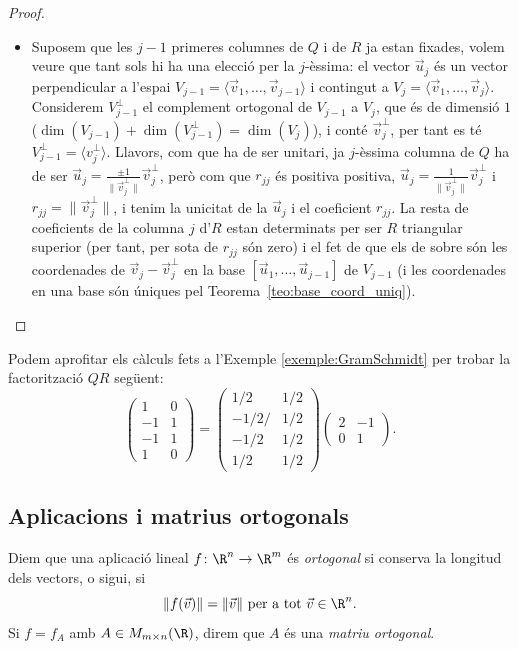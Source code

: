 \begin{proof}
\begin{itemize}
    \item Suposem que les $j-1$ primeres columnes de $Q$ i de $R$ ja estan fixades, volem veure que tant sols hi ha una elecció per la $j$-èssima: el vector $\vec u_j$ és un vector perpendicular a l'espai $V_{j-1}=\langle \vec v_1, \dots, \vec v_{j-1}\rangle$ i contingut a $V_j=\langle \vec v_1, \dots, \vec v_j\rangle$. Considerem $V_{j-1}^\perp$ el complement ortogonal de $V_{j-1}$ a $V_j$, que és de dimensió $1$ ($\dim(V_{j-1})+\dim(V_{j-1}^\perp)=\dim(V_j)$), i conté $\vec v_j^\perp$, per tant es té $V_{j-1}^\perp=\langle v_j^\perp \rangle$. Llavors, com que ha de ser unitari, ja $j$-èssima columna de $Q$ ha de ser $\vec u_j=\frac{\pm1}{\|\vec v_j^\perp\|}\vec v_j^\perp$, però com que $r_{jj}$ és positiva positiva, $\vec u_j=\frac{1}{\|\vec v_j^\perp\|}\vec v_j^\perp$ i $r_{jj}=\|\vec v_j^\perp\|$, i tenim la unicitat de la $\vec u_j$ i el coeficient $r_{jj}$. La resta de coeficients de la columna $j$ d'$R$ estan determinats per ser $R$ triangular superior (per tant, per sota de $r_{jj}$ són zero) i el fet de que els de sobre són les coordenades de $\vec v_j-\vec v_j^\perp$ en la base $[\vec u_1,\dots,\vec u_{j-1}]$ de $V_{j-1}$ (i les coordenades en una base són úniques pel Teorema~\ref{teo:base_coord_uniq}).
\end{itemize}
\end{proof}
\begin{exemple}
Podem aprofitar els càlculs fets a l'Exemple \ref{exemple:GramSchmidt} per trobar la factorització $QR$ següent:
\[
\begin{pmatrix}
1 & 0 \\ -1 & 1 \\ -1 & 1 \\ 1 & 0
\end{pmatrix}=
\begin{pmatrix}
1/2 & 1/2 \\ -1/2/ & 1/2 \\ -1/2 & 1/2 \\ 1/2 & 1/2
\end{pmatrix}
\begin{pmatrix}
2 & -1 \\ 0 & 1
\end{pmatrix}.
\]
\end{exemple}

\subsection{Aplicacions i matrius ortogonals}
\begin{definicio}
Diem que una aplicació lineal $f \colon \R^n\to \R^m$ és \emph{ortogonal} si conserva la longitud dels vectors, o sigui, si
\[
\|f(\vec v)\|=\|\vec v\| \text{ per a tot $\vec v\in\R^n$.}
\]
Si $f=f_A$ amb $A\in M_{m\times n}(\R)$, direm que $A$ és una \emph{matriu ortogonal}.
\end{definicio}


